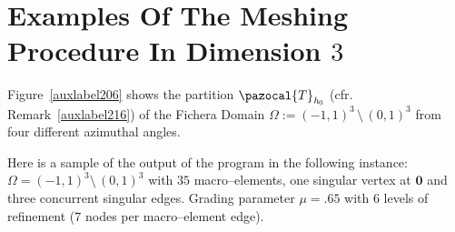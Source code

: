 \section{Examples Of The Meshing Procedure In Dimension $3$} %
\label{auxlabel214}
Figure~\ref{auxlabel206} shows the partition $\pazocal{T}_{\textit{h}_0}$ (cfr. Remark~\ref{auxlabel216}) of the Fichera Domain 
$\Omega:=(-1,1)^3\,\setminus\,(0,1)^3$ from four different azimuthal 
angles. 

\tauZero 

\newpage
Here is a sample of the output of the program in the following instance:
$\Omega = (-1,1)^3\setminus\,(0,1)^3$ with $35$ macro--elements, one singular
vertex at $\boldsymbol{0}$ and three concurrent singular edges. Grading parameter
$\mu = .65$ with $6$ levels of refinement ($7$ nodes per macro--element edge).


